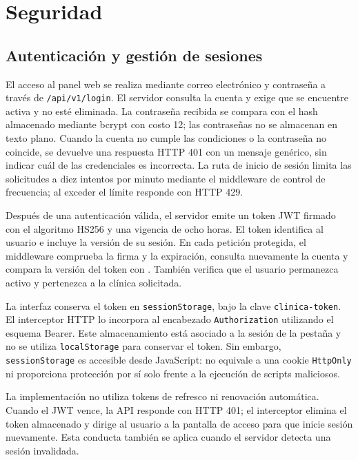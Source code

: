 \documentclass[12pt,letterpaper]{report}
\begin{document}
\setcounter{chapter}{2}\setcounter{section}{6}
\section{Seguridad}

\subsection{Autenticación y gestión de sesiones}

El acceso al panel web se realiza mediante correo electrónico y contraseña
a través de \texttt{/api/v1/login}. El servidor consulta la cuenta y exige que
se encuentre activa y no esté eliminada. La contraseña recibida se compara
con el hash almacenado mediante bcrypt con costo 12; las contraseñas no se almacenan en
texto plano. Cuando la cuenta no cumple las condiciones o la contraseña no
coincide, se devuelve una respuesta HTTP 401 con un mensaje genérico, sin
indicar cuál de las credenciales es incorrecta. La ruta de inicio de sesión
limita las solicitudes a diez intentos por minuto mediante el middleware
de control de frecuencia; al exceder el límite responde con HTTP 429.

Después de una autenticación válida, el servidor emite un token JWT firmado
con el algoritmo HS256 y una vigencia de ocho horas. El token identifica al
usuario e incluye la versión de su sesión. En cada petición protegida, el
middleware comprueba la firma y la expiración, consulta nuevamente la cuenta
y compara la versión del token con . También verifica
que el usuario permanezca activo y pertenezca a la clínica solicitada.

La interfaz conserva el token en \texttt{sessionStorage}, bajo la clave
\texttt{clinica-token}. El interceptor HTTP lo incorpora al encabezado
\texttt{Authorization} utilizando el esquema Bearer. Este almacenamiento
está asociado a la sesión de la pestaña y no se utiliza
\texttt{localStorage} para conservar el token. Sin embargo,
\texttt{sessionStorage} es accesible desde JavaScript: no equivale a una
cookie \texttt{HttpOnly} ni proporciona protección por sí solo frente a
la ejecución de scripts maliciosos.

La implementación no utiliza tokens de refresco ni renovación automática.
Cuando el JWT vence, la API responde con HTTP 401; el interceptor elimina
el token almacenado y dirige al usuario a la pantalla de acceso para que
inicie sesión nuevamente. Esta conducta también se aplica cuando el
servidor detecta una sesión invalidada.
\end{document}
